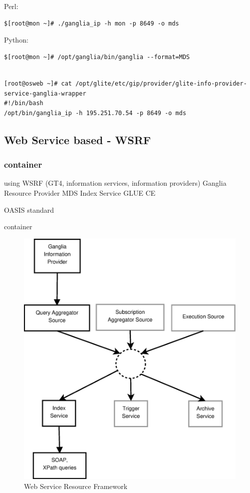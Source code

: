 Perl:
\begin{lstlisting}
$[root@mon ~]# ./ganglia_ip -h mon -p 8649 -o mds
\end{lstlisting}

Python:
\begin{lstlisting}
$[root@mon ~]# /opt/ganglia/bin/ganglia --format=MDS
\end{lstlisting}

\begin{lstlisting}

[root@osweb ~]# cat /opt/glite/etc/gip/provider/glite-info-provider-service-ganglia-wrapper
#!/bin/bash
/opt/bin/ganglia_ip -h 195.251.70.54 -p 8649 -o mds
\end{lstlisting}

\newpage

\subsection{Web Service based - WSRF}
\subsubsection{container}
using WSRF (GT4, information services, information providers)
Ganglia Resource Provider
MDS Index Service
GLUE CE 

OASIS standard

container
\begin{figure}[htb]
\centering
 \includegraphics[width=5in]{images/wsrf.eps}
\caption{Web Service Resource Framework}
\label{figure:wsrf}
\end{figure}
\newpage
